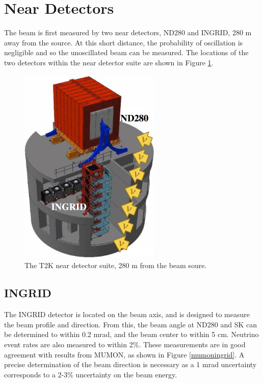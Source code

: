 \section{Near Detectors}\label{sec:nd}

The beam is first measured by two near detectors, ND280 and INGRID, 280 m away from the source. At this short distance, the probability of oscillation is negligible and so the unoscillated beam can be measured. The locations of the two detectors within the near detector suite are shown in Figure \ref{ndpit}.

\begin{figure}[!htbp]
\centering
\includegraphics*[width=0.6\textwidth,clip]{figs/ndpit}
\caption{The T2K near detector suite, 280 m from the beam soure. } \label{ndpit}
\end{figure}

\subsection{INGRID}\label{sec:ingrid}

The INGRID detector is located on the beam axis, and is designed to measure the beam profile and direction. From this, the beam angle at ND280 and SK can be determined to within 0.2 mrad, and the beam center to within 5 cm. Neutrino event rates are also measured to within 2$\%$. These measurements are in good agreement with results from MUMON, as shown in Figure \ref{mumoningrid}. A precise determination of the beam direction is necessary as a 1 mrad uncertainty corresponds to a 2-3$\%$ uncertainty on the beam energy.

